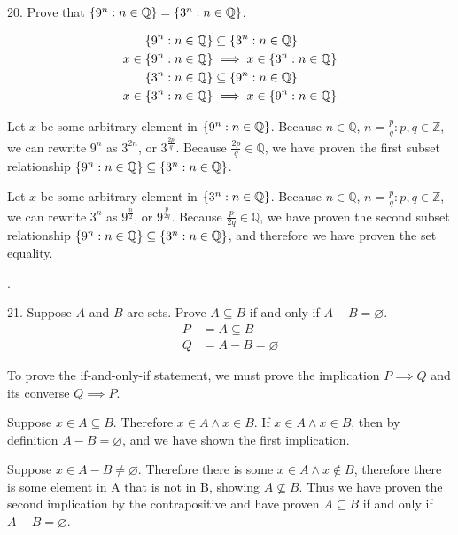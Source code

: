 \documentclass[openany, 12pt]{book}
\begin{document}
\begin{exercise}{}{}
	{20. Prove that $\{9^n: n \in \mathbb{Q}\}=\{3^n: n \in
				\mathbb{Q}\}$.}

	\begin{align*}
		\{9^n: n \in \mathbb{Q}\}      & \subseteq\{3^n: n \in \mathbb{Q}\}     \\
		x\in \{9^n: n \in \mathbb{Q}\} & \implies x\in\{3^n: n \in \mathbb{Q}\} \\
		\{3^n: n \in \mathbb{Q}\}
		                                 & \subseteq
		\{9^n: n \in \mathbb{Q}\}                                                 \\
		x\in\{3^n: n \in \mathbb{Q}\}
		                                 & \implies
		x\in \{9^n: n \in \mathbb{Q}\}
	\end{align*}
	\begin{alist}
		\item Let $x$ be some arbitrary element in $\{9^n: n \in \mathbb{Q}\}$.
		Because $n\in\mathbb{Q}$, $n=\frac{p}{q}: p,q\in\mathbb{Z}$,
		we can rewrite $9^n$ as $3^{2n}$, or $3^{\frac{2p}{q}}$. Because
		$\frac{2p}{q} \in \mathbb{Q}$, we have proven the first subset
		relationship $\{9^n: n \in \mathbb{Q}\} \subseteq\{3^n: n \in
				\mathbb{Q}\}$.
		\item Let $x$ be some arbitrary element in $\{3^n: n \in \mathbb{Q}\}$.
		Because $n\in\mathbb{Q}$, $n=\frac{p}{q}: p,q\in\mathbb{Z}$,
		we can rewrite $3^n$ as $9^{\frac{n}{2}}$, or $9^{\frac{p}{2q}}$. Because
		$\frac{p}{2q} \in \mathbb{Q}$, we have proven the second subset
		relationship $\{9^n: n \in \mathbb{Q}\} \subseteq\{3^n: n \in
				\mathbb{Q}\}$, and therefore we have proven the set equality.
	\end{alist}
\end{exercise}.

\begin{exercise}{}{}
	{21. Suppose $A$ and $B$ are sets. Prove $A \subseteq B$ if and only if $A-B=\varnothing$.}
	\begin{align*}
		P & = A \subseteq B       \\
		Q & = A - B = \varnothing
	\end{align*}
	\begin{alist}
		\item
		To prove the if-and-only-if statement, we must prove the implication $P\implies
			Q$ and its converse $Q\implies P$.
		\item Suppose $x\in A\subseteq B$. Therefore $x\in A \land x \in B$. If $x\in
			A\land x\in B$, then by definition $A-B=\varnothing$, and we have shown the
		first implication.
		\item Suppose $x\in A-B\neq\varnothing$. Therefore there is some $x\in A\land
			x\notin B$, therefore there is some element in A that is not in B, showing
		$A\not\subseteq B$. Thus we have proven the second implication by the
		contrapositive and have proven $A \subseteq B$ if and only if
		$A-B=\varnothing$.
	\end{alist}
\end{exercise}
\end{document}
